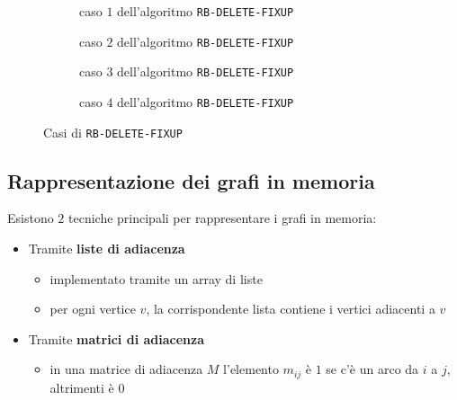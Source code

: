 \documentclass[italian, 10pt]{article}
\begin{document}
\begin{figure}[htbp]
  \begin{subfigure}{\textwidth}
    \centering
    \bigskip
    \caption{caso \(1\) dell'algoritmo \texttt{RB-DELETE-FIXUP}}
    \label{fig:caso-1-algoritmo-rb-delete-fixup}
    \bigskip
  \end{subfigure}
  \begin{subfigure}{\textwidth}
    \centering
    \bigskip
    \caption{caso \(2\) dell'algoritmo \texttt{RB-DELETE-FIXUP}}
    \label{fig:caso-2-algoritmo-rb-delete-fixup}
    \bigskip
  \end{subfigure}
  \begin{subfigure}{\textwidth}
    \centering
    \bigskip
    \caption{caso \(3\) dell'algoritmo \texttt{RB-DELETE-FIXUP}}
    \label{fig:caso-3-algoritmo-rb-delete-fixup}
    \bigskip
  \end{subfigure}
  \begin{subfigure}{0.99\textwidth}
    \centering
    \bigskip
    \caption{caso \(4\) dell'algoritmo \texttt{RB-DELETE-FIXUP}}
    \label{fig:caso-4-algoritmo-rb-delete-fixup}
    \bigskip
  \end{subfigure}

  \caption{Casi di \texttt{RB-DELETE-FIXUP}}
  \label{fig:casi-algoritmo-rb-delete-fixup}
\end{figure}

\subsection{Rappresentazione dei grafi in memoria}

Esistono \(2\) tecniche principali per rappresentare i grafi in memoria:

\begin{itemize}
  \item Tramite \textbf{liste di adiacenza}
        \begin{itemize}
          \item implementato tramite un array di liste
          \item per ogni vertice \(v\), la corrispondente lista contiene i vertici adiacenti a \(v\)
        \end{itemize}
  \item Tramite \textbf{matrici di adiacenza}
        \begin{itemize}
          \item in una matrice di adiacenza \(M\) l'elemento \(m_{ij}\) è \(1\) se c'è un arco da \(i\) a \(j\), altrimenti è \(0\)
        \end{itemize}
\end{itemize}
\end{document}
